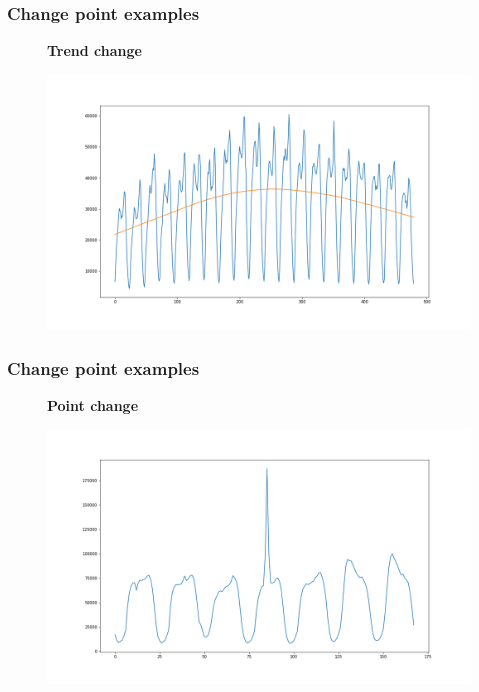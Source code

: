 \documentclass[intlimits, 9pt, unicode]{beamer}
\begin{document}
\begin{frame}
\frametitle{Change point examples}
\begin{figure}
\textbf{Trend change}\par\medskip
\includegraphics[scale=0.30]{images/004_trend}
\end{figure}
\end{frame}

\begin{frame}
\frametitle{Change point examples}
\begin{figure}
\textbf{Point change}\par\medskip
\includegraphics[scale=0.30]{images/005_point}
\end{figure}
\end{frame}
\end{document}
